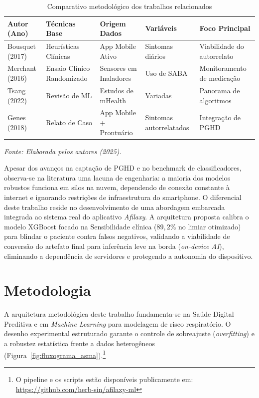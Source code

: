 \documentclass[12pt]{article}
\begin{document}
\begin{table}[ht!]
\centering
\small
\caption{Comparativo metodológico dos trabalhos relacionados}
\label{tab:trabalhos_relacionados}
\vskip 0.05in
\begin{tabularx}{\textwidth}{lXXXX}
\hline
\textbf{Autor (Ano)} & \textbf{Técnicas Base} & \textbf{Origem Dados} & \textbf{Variáveis} & \textbf{Foco Principal} \\ \hline
Bousquet (2017) & Heurísticas Clínicas & App Mobile Ativo & Sintomas diários & Viabilidade do autorrelato \\ \hline
Merchant (2016) & Ensaio Clínico Randomizado & Sensores em Inaladores & Uso de SABA & Monitoramento de medicação \\ \hline
Tsang (2022) & Revisão de ML & Estudos de mHealth & Variadas & Panorama de algoritmos \\ \hline
Genes (2018) & Relato de Caso & App Mobile + Prontuário & Sintomas autorrelatados & Integração de PGHD \\ \hline
\end{tabularx}
\vskip 0.05in
\footnotesize{\textit{Fonte: Elaborada pelos autores (2025).}}
\end{table}

Apesar dos avanços na captação de PGHD e no benchmark de classificadores, observa-se na literatura uma lacuna de engenharia: a maioria dos modelos robustos funciona em silos na nuvem, dependendo de conexão constante à internet e ignorando restrições de infraestrutura do smartphone. O diferencial deste trabalho reside no desenvolvimento de uma abordagem embarcada integrada ao sistema real do aplicativo \textit{Afilaxy}. A arquitetura proposta calibra o modelo XGBoost focado na Sensibilidade clínica ($89,2\%$ no limiar otimizado) para blindar o paciente contra falsos negativos, validando a viabilidade de conversão do artefato final para inferência leve na borda (\textit{on-device AI}), eliminando a dependência de servidores e protegendo a autonomia do dispositivo.

\section{Metodologia}

A arquitetura metodológica deste trabalho fundamenta-se na Saúde Digital Preditiva e em \textit{Machine Learning} para modelagem de risco respiratório. O desenho experimental estruturado garante o controle de sobreajuste (\textit{overfitting}) e a robustez estatística frente a dados heterogêneos (Figura~\ref{fig:fluxograma_asma}).\footnote{O pipeline e os scripts estão disponíveis publicamente em: \url{https://github.com/herb-sin/afilaxy-ml}}
\end{document}

